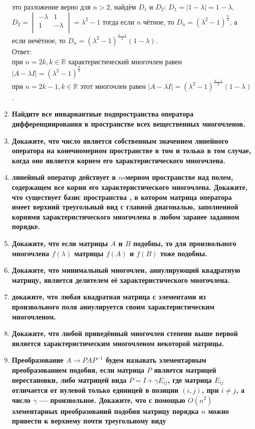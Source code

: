 \documentclass[12pt]{article} %
\begin{document}
\begin{enumerate}
\[    \]
    это разложение верно для $n > 2$, найдём $D_1$ и $D_2$: $D_1 = |1 - \lambda| = 1 - \lambda$,\\ $D_2 = 
    \begin{vmatrix}
        -\lambda & 1\\
        1 & -\lambda\\
    \end{vmatrix}
     = \lambda^2 - 1
    $
    тогда если $n$ чётное, то $D_n = (\lambda^2 - 1)^{\frac{n}{2}}$, а если нечётное, то $D_n = (\lambda^2 - 1)^{\frac{n - 1}{2}}(1 - \lambda)$.\\
    Ответ:\\ при $n = 2k, k \in \mathds{R}$ характеристический многочлен равен $|A - \lambda I| = (\lambda^2 - 1)^{\frac{n}{2}}$\\
    при $n = 2k - 1, k \in \mathds{R}$ этот многочлен равен $|A - \lambda I| = (\lambda^2 - 1)^{\frac{n - 1}{2}}(1 - \lambda)$.\\
    \item \textbf{Найдите все инвариантные подпространства оператора дифференциирования в пространстве всех вещественных многочленов.}
    \item \textbf{Докажите, что число является собственным значением линейного оператора на конечномерном пространстве в том и только в том случае, когда оно является корнем его характеристического многочлена.}
    \item \textbf{линейный оператор действует в $n$-мерном пространстве над полем, содержащем все корни его характеристического многочлена. Докажите, что существует базис пространства , в котором матрица оператора имеет верхний треугольный вид с главной диагональю, заполненной корнями характеристического многочлена в любом заранее заданном порядке.}
    \item \textbf{Докажите, что если матрицы $A$ и $B$ подобны, то для произвольного многочлена $f(\lambda)$ матрицы $f(A)$ и $f(B)$ тоже подобны.}
    \item \textbf{Докажите, что минимальный многочлен, аннулирующий квадратную матрицу, является делителем её характеристического многочлена.}
    \item \textbf{докажите, что любая квадратная матрица с элементами из произвольного поля аннулируется своим характеристическим многочленом.}
    \item \textbf{Докажите, что любой приведённый многочлен степени выше первой является характеристическим многочленом некоторой матрицы.}
    \item \textbf{Преобразование $A \rightarrow PAP^{-1}$ будем называть элементарным преобразованием подобия, если матрица $P$ является матрицей перестановки, либо матрицей вида $P = I + \gamma E_{ij}$, где матрица $E_{ij} $ отличается от нулевой только единицей в позиции $(i, j)$, при $i \neq j$, а число $\gamma$ --- произвольное. Докажите, что с помощью $O(n^2)$ элементарных преобразований подобия матрицу порядка $n$ можно привести к верхнему почти треугольному виду}%

\end{enumerate}
\end{document}
